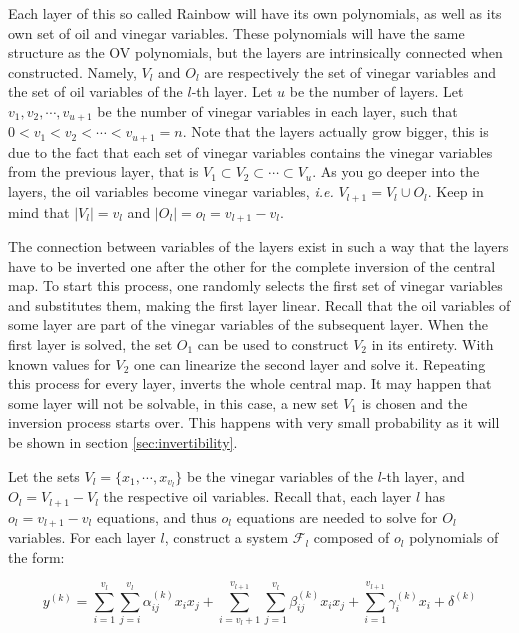 \documentclass{ufsctex/ufsctex}
\begin{document}
Each layer of this so called Rainbow will have its own polynomials, as well as
its own set of oil and vinegar variables. These polynomials will have the same
structure as the OV polynomials, but the layers are intrinsically connected
when constructed. Namely, $V_l$ and $O_l$ are respectively the set of vinegar
variables and the set of oil variables of the $l$-th layer. Let $u$ be the
number of layers. Let $v_1, v_2, \cdots, v_{u+1}$ be the number of vinegar
variables in each layer, such that $0 < v_1 < v_2 < \cdots < v_{u+1} = n$. Note
that the layers actually grow bigger, this is due to the fact that each set of
vinegar variables contains the vinegar variables from the previous layer, that
is $V_1 \subset V_2 \subset \cdots \subset V_{u}$. As you go deeper into the
layers, the oil variables become vinegar variables, \textit{i.e.} $V_{l+1} =
V_l \cup O_l$. Keep in mind that $|V_l| = v_l$ and $|O_l| = o_l = v_{l+1} -
v_{l}$.

The connection between variables of the layers exist in such a way that the
layers have to be inverted one after the other for the complete inversion of
the central map. To start this process, one randomly selects the first set of
vinegar variables and substitutes them, making the first layer linear. Recall
that the oil variables of some layer are part of the vinegar variables of the
subsequent layer. When the first layer is solved, the set $O_1$ can be used to
construct $V_2$ in its entirety. With known values for $V_2$ one can linearize
the second layer and solve it. Repeating this process for every layer, inverts
the whole central map. It may happen that some layer will not be solvable, in
this case, a new set $V_1$ is chosen and the inversion process starts over.
This happens with very small probability as it will be shown in section
\ref{sec:invertibility}.

Let the sets $V_l = \{x_1, \cdots, x_{v_l}\}$ be the vinegar variables of the
$l$-th layer, and $O_l = V_{l+1} - V_l$ the respective oil variables. Recall
that, each layer $l$ has $o_l = v_{l+1} - v_{l}$ equations, and thus $o_l$
equations are needed to solve for $O_l$ variables. For each layer $l$,
construct a system $\mathcal{F}_l$ composed of $o_l$ polynomials of the form:

\begin{equation}\label{eq:rainbowmap}
y^{(k)} =
\sum_{i=1}^{v_l}\sum_{j=i}^{v_l} \alpha^{(k)}_{ij} x_i x_j +
\sum_{i=v_l+1}^{v_{l+1}}\sum_{j=1}^{v_l} \beta^{(k)}_{ij} x_i x_j +
\sum_{i=1}^{v_{l+1}} \gamma^{(k)}_{i} x_i +
\delta^{(k)}
\end{equation}
\end{document}

